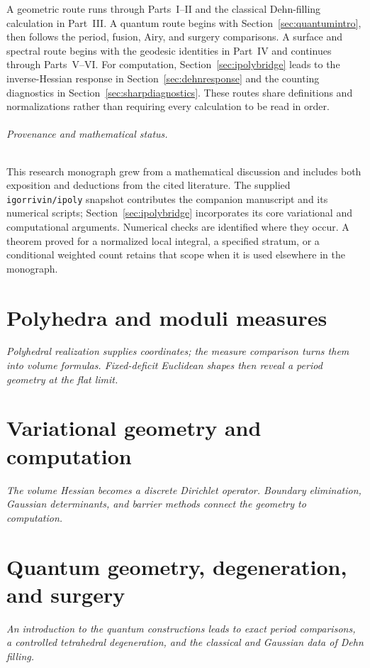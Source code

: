 \documentclass[11pt,a4paper]{article}
\newcommand{\monographpart}[2]{%
  \clearpage\part{#1}%
  \noindent\textit{#2}\par\medskip}
\numberwithin{equation}{section}
\theoremstyle{definition}
\theoremstyle{remark}
\begin{document}
A geometric route runs through Parts~I--II and the classical Dehn-filling
calculation in Part~III. A quantum route begins with
Section~\ref{sec:quantumintro}, then follows the period, fusion, Airy, and
surgery comparisons. A surface and spectral route begins with the
geodesic identities in Part~IV and continues through Parts~V--VI.
For computation, Section~\ref{sec:ipolybridge} leads to the inverse-Hessian
response in Section~\ref{sec:dehnresponse} and the counting diagnostics in
Section~\ref{sec:sharpdiagnostics}. These routes share definitions and
normalizations rather than requiring every calculation to be read in order.

\paragraph{Provenance and mathematical status.}
This research monograph grew from a mathematical discussion and includes
both exposition and deductions from the cited literature. The supplied
\texttt{igorrivin/ipoly} snapshot contributes the companion manuscript
and its numerical scripts; Section~\ref{sec:ipolybridge} incorporates its
core variational and computational arguments. Numerical checks are
identified where they occur. A theorem proved for a normalized local
integral, a specified stratum, or a conditional weighted count retains
that scope when it is used elsewhere in the monograph.



\monographpart{Polyhedra and moduli measures}{Polyhedral realization supplies coordinates; the measure comparison turns them into volume formulas. Fixed-deficit Euclidean shapes then reveal a period geometry at the flat limit.}









\monographpart{Variational geometry and computation}{The volume Hessian becomes a discrete Dirichlet operator. Boundary elimination, Gaussian determinants, and barrier methods connect the geometry to computation.}


\monographpart{Quantum geometry, degeneration, and surgery}{An introduction to the quantum constructions leads to exact period comparisons, a controlled tetrahedral degeneration, and the classical and Gaussian data of Dehn filling.}
\end{document}

